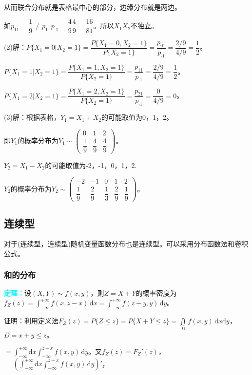 \documentclass[UTF8, 12pt]{ctexart}
\begin{document}
从而联合分布就是表格最中心的部分，边缘分布就是两边。

如$p_{11}=\dfrac{1}{9}\neq p_{1\cdot}p_{\cdot1}=\dfrac{4}{9}\dfrac{4}{9}=\dfrac{16}{81}$。所以$X_1X_2$不独立。

(2)解：$P\{X_1=0|X_2=1\}=\dfrac{P\{X_1=0,X_2=1\}}{P\{X_2=1\}}=\dfrac{p_{01}}{p_{\cdot1}}=\dfrac{2/9}{4/9}=\dfrac{1}{2}$。

$P\{X_1=1|X_2=1\}=\dfrac{P\{X_1=1,X_2=1\}}{P\{X_2=1\}}=\dfrac{p_{11}}{p_{\cdot1}}=\dfrac{2/9}{4/9}=\dfrac{1}{2}$。

$P\{X_1=2|X_2=1\}=\dfrac{P\{X_1=2,X_2=1\}}{P\{X_2=1\}}=\dfrac{p_{21}}{p_{\cdot1}}=\dfrac{0}{4/9}=0$。

(3)解：根据表格，$Y_1=X_1+X_2$的可能取值为0，1，2。

即$Y_1$的概率分布为$Y_1\sim\left(\begin{array}{ccc}
    0 & 1 & 2 \\
    \dfrac{1}{9} & \dfrac{4}{9} & \dfrac{4}{9}
\end{array}\right)$。

$Y_2=X_1-X_2$的可能取值为-2，-1，0，1，2.

$Y_2$的概率分布为$Y_2\sim\left(\begin{array}{ccccc}
    -2 & -1 & 0 & 1 & 2 \\
    \dfrac{1}{9} & \dfrac{2}{9} & \dfrac{1}{3} & \dfrac{2}{9} & \dfrac{1}{9}
\end{array}\right)$。

\subsection{连续型}

对于(连续型，连续型)随机变量函数分布也是连续型。可以采用分布函数法和卷积公式。

\subsubsection{和的分布}

\textcolor{aqua}{\textbf{定理：}}设$(X,Y)\sim f(x,y)$，则$Z=X+Y$的概率密度为$f_Z(z)=\int_{-\infty}^{+\infty}f(x,z-x)\,\textrm{d}x=\int_{-\infty}^{+\infty}f(z-y,y)\,\textrm{d}y$。

证明：利用定义法$F_Z(z)=P\{Z\leqslant z\}=P\{X+Y\leqslant z\}=\iint\limits_Df(x,y)\,\textrm{d}x\textrm{d}y$，$D=x+y\leqslant z$。

$=\int_{-\infty}^{+\infty}\textrm{d}x\int_{-\infty}^{z-x}f(x,y)\,\textrm{d}y$。又$f_Z(z)=F_Z'(z)$，$=(\int_{-\infty}^{+\infty}\textrm{d}x\int_{-\infty}^{z-x}f(x,y)\,\textrm{d}y)'_z$
\end{document}
